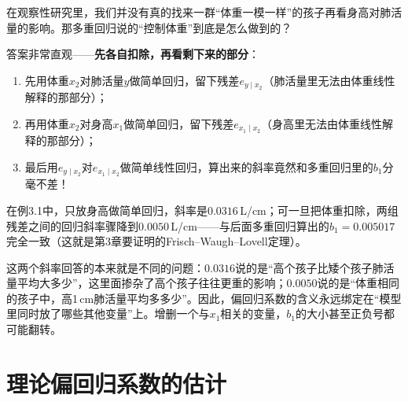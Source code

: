 \begin{sikao}
在观察性研究里，我们并没有真的找来一群“体重一模一样”的孩子再看身高对肺活量的影响。那多重回归说的“控制体重”到底是怎么做到的？

答案非常直观——\textbf{先各自扣除，再看剩下来的部分}：
\begin{enumerate}
\item 先用体重$x_2$对肺活量$y$做简单回归，留下残差$e_{y\mid x_2}$（肺活量里无法由体重线性解释的那部分）；
\item 再用体重$x_2$对身高$x_1$做简单回归，留下残差$e_{x_1\mid x_2}$（身高里无法由体重线性解释的那部分）；
\item 最后用$e_{y\mid x_2}$对$e_{x_1\mid x_2}$做简单线性回归，算出来的斜率竟然和多重回归里的$b_1$分毫不差！
\end{enumerate}
在例3.1中，只放身高做简单回归，斜率是$0.0316$\,L/cm；可一旦把体重扣除，两组残差之间的回归斜率骤降到$0.0050$\,L/cm——与后面多重回归算出的$b_1=0.005017$完全一致（这就是第3章要证明的Frisch--Waugh--Lovell定理）。

这两个斜率回答的本来就是不同的问题：$0.0316$说的是“高个孩子比矮个孩子肺活量平均大多少”，这里面掺杂了高个孩子往往更重的影响；$0.0050$说的是“体重相同的孩子中，高1\,cm肺活量平均多多少”。因此，偏回归系数的含义永远绑定在“模型里同时放了哪些其他变量”上。增删一个与$x_1$相关的变量，$b_1$的大小甚至正负号都可能翻转。
\end{sikao}

\section{理论偏回归系数的估计}
